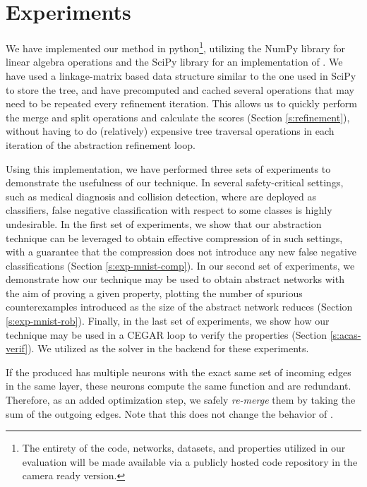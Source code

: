 \section{Experiments} 

We have implemented our method in python\footnote{The entirety of the code,
    networks, datasets, and properties utilized in our evaluation will be made
    available via a publicly hosted code repository in the
camera ready version.}, utilizing the NumPy
library for linear algebra operations and the SciPy
library for an
implementation of \hcluster.
We have used a linkage-matrix based
data structure similar to the one used in SciPy to store the tree, and have
precomputed and cached several
operations that may need to be repeated every refinement iteration. This allows
us to quickly perform the merge and split operations and calculate the
scores (Section \ref{s:refinement}), without having to do (relatively)
expensive tree traversal operations in each iteration of the abstraction
refinement loop. 

Using this implementation, we have performed three sets of experiments to
demonstrate the usefulness of our technique. In several safety-critical
settings, such as medical diagnosis and collision detection, where \dnn are
deployed as classifiers, false negative classification with respect to some
classes is highly undesirable. In the first set of experiments, we show that
our abstraction technique can be leveraged to obtain effective compression of
\dnn in such settings, with a guarantee that the compression does not introduce
any new false negative classifications (Section \ref{s:exp-mnist-comp}). In our
second set of experiments, we demonstrate how our technique may be used to
obtain abstract networks with the aim of proving a given property, plotting the
number of spurious counterexamples introduced as the size of the abstract
network reduces (Section \ref{s:exp-mnist-rob}). Finally, in the last set of
experiments, we show how our technique may be used in a CEGAR loop
\cite{cegar-nn} to verify the \acasxu properties (Section \ref{s:acas-verif}).
We utilized \abcrown as the solver in the backend for these experiments. 

If the \abs produced has multiple neurons with the exact same set of incoming
edges in the same layer, these neurons compute the same function and are
redundant. Therefore, as an added optimization step, we safely \textit{re-merge}
them by taking the sum of the outgoing edges. Note that this does not change the
behavior of \abs.


